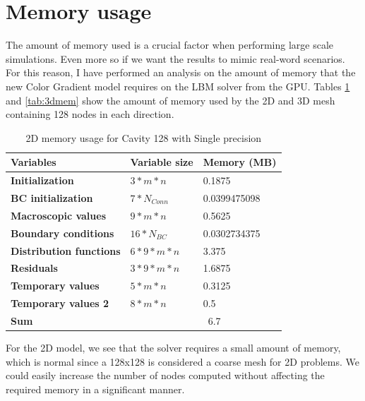 \documentclass[12pt, openany]{book}
\begin{document}
\section{Memory usage}
The amount of memory used is a crucial factor when performing large scale simulations. Even more so if we want the results to mimic real-word scenarios. For this reason, I have performed an analysis on the amount of memory that the new Color Gradient model requires on the LBM solver from the GPU. Tables \ref{tab:2dmem} and \ref{tab:3dmem} show the amount of memory used by the 2D and 3D mesh containing 128 nodes in each direction.
\begin{table}[H]
	\centering
	\begin{tabular}{|l|l|l|}
		\hline
		\textbf{Variables}              & \textbf{Variable size}   & \textbf{Memory (MB)} \\ \hline
		\textbf{Initialization}         & $3 * m * n$              & 0.1875               \\ \hline
		\textbf{BC initialization}      & $7 * N_{Conn}$           & 0.0399475098         \\ \hline
		\textbf{Macroscopic values}     & $9 * m * n$              & 0.5625               \\ \hline
		\textbf{Boundary conditions}    & $16 * N_{BC}$            & 0.0302734375         \\ \hline
		\textbf{Distribution functions} & $6 * 9 * m * n$          & 3.375                \\ \hline
		\textbf{Residuals}              & $3 * 9 * m * n$          & 1.6875               \\ \hline
		\textbf{Temporary values}       & $5 * m * n$              & 0.3125               \\ \hline
		\textbf{Temporary values 2}     & $8 * m * n $        	   & 0.5                    \\ \hline
		\textbf{Sum}                    &                          & ~6.7         \\ \hline
	\end{tabular}	
	\caption{2D memory usage for Cavity 128 with Single precision}
	\label{tab:2dmem}
\end{table}

For the 2D model, we see that the solver requires a small amount of memory, which is normal since a 128x128 is considered a coarse mesh for 2D problems. We could easily increase the number of nodes computed without affecting the required memory in a significant manner. 
\end{document}
